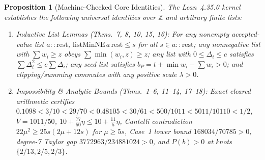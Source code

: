 \documentclass[10pt,twocolumn]{article}
\newtheorem{proposition}{Proposition}
\newcommand{\ZZ}{\mathbb{Z}}
\begin{document}
\begin{proposition}[Machine-Checked Core Identities]\label{prop:lean}
The Lean~4.35.0 kernel establishes the following universal identities over $\ZZ$ and arbitrary finite lists:
\begin{enumerate}[leftmargin=*,nosep]
  \item \emph{Inductive List Lemmas (Thms.~7, 8, 10, 15, 16):} For any nonempty accepted-value list $a::\mathrm{rest}$, $\mathrm{listMinNE}\,a\,\mathrm{rest} \le s$ for all $s \in a::\mathrm{rest}$; any nonnegative list with $\sum w_i \ge z$ obeys $\sum \min(w_i, z) \ge z$; any list with $0 \le \Delta_i \le c$ satisfies $\sum \Delta_i^2 \le c\sum \Delta_i$; any seed list satisfies $b_P = t + \min w_i - \sum w_i > 0$; and clipping/summing commutes with any positive scale $\lambda > 0$.
  \item \emph{Impossibility \& Analytic Bounds (Thms.~1--6, 11--14, 17--18):} Exact cleared arithmetic certifies $0.1098 < 3/10 < 29/70 < 0.48105 < 30/61 < 500/1011 < 5011/10110 < 1/2$, $V = 1011/50$, $10 + \frac{77}{50}\eta \le 10 + \frac{11}{5}\eta$, Cantelli contradiction $22\mu^2 \ge 25s(2\mu+12s)$ for $\mu \ge 5s$, Case~1 lower bound $168034/70785 > 0$, degree-7 Taylor gap $3772963/234881024 > 0$, and $P(b) > 0$ at knots $\{2/13, 2/5, 2/3\}$.
\end{enumerate}
\end{proposition}
\end{document}
